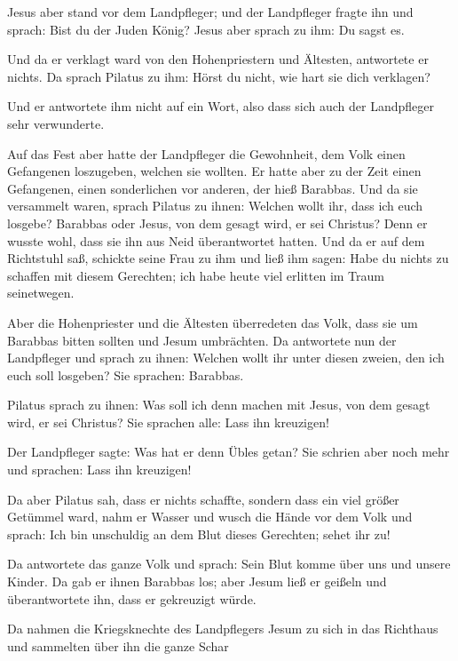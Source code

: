  Jesus aber stand vor dem Landpfleger; und der
Landpfleger fragte ihn und sprach: Bist du der Juden König? Jesus aber
sprach zu ihm: Du sagst es.

 Und da er verklagt ward von den Hohenpriestern und
Ältesten, antwortete er nichts.  Da sprach Pilatus zu
ihm: Hörst du nicht, wie hart sie dich verklagen?

 Und er antwortete ihm nicht auf ein Wort, also dass sich
auch der Landpfleger sehr verwunderte.

 Auf das Fest aber hatte der Landpfleger die Gewohnheit,
dem Volk einen Gefangenen loszugeben, welchen sie wollten.
 Er hatte aber zu der Zeit einen Gefangenen, einen
sonderlichen vor anderen, der hieß Barabbas.  Und da sie
versammelt waren, sprach Pilatus zu ihnen: Welchen wollt ihr, dass ich
euch losgebe? Barabbas oder Jesus, von dem gesagt wird, er sei Christus?
 Denn er wusste wohl, dass sie ihn aus Neid überantwortet
hatten.  Und da er auf dem Richtstuhl saß, schickte seine
Frau zu ihm und ließ ihm sagen: Habe du nichts zu schaffen mit diesem
Gerechten; ich habe heute viel erlitten im Traum seinetwegen.

 Aber die Hohenpriester und die Ältesten überredeten das
Volk, dass sie um Barabbas bitten sollten und Jesum umbrächten.
 Da antwortete nun der Landpfleger und sprach zu ihnen:
Welchen wollt ihr unter diesen zweien, den ich euch soll losgeben? Sie
sprachen: Barabbas.

 Pilatus sprach zu ihnen: Was soll ich denn machen mit
Jesus, von dem gesagt wird, er sei Christus? Sie sprachen alle: Lass ihn
kreuzigen!

 Der Landpfleger sagte: Was hat er denn Übles getan? Sie
schrien aber noch mehr und sprachen: Lass ihn kreuzigen!

 Da aber Pilatus sah, dass er nichts schaffte, sondern
dass ein viel größer Getümmel ward, nahm er Wasser und wusch die Hände
vor dem Volk und sprach: Ich bin unschuldig an dem Blut dieses
Gerechten; sehet ihr zu!

 Da antwortete das ganze Volk und sprach: Sein Blut komme
über uns und unsere Kinder.  Da gab er ihnen Barabbas
los; aber Jesum ließ er geißeln und überantwortete ihn, dass er
gekreuzigt würde.

 Da nahmen die Kriegsknechte des Landpflegers Jesum zu
sich in das Richthaus und sammelten über ihn die ganze Schar

